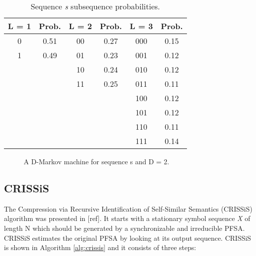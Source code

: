 {\begin{table}
\centering
\caption{Sequence \textit{s} subsequence probabilities. \label{tab:subseq}}
\begin{tabular}{|c|c|c|c|c|c|}
\hline
\textbf{L = 1} & \textbf{Prob.} & \textbf{L = 2} & \textbf{Prob.} & \textbf{L = 3} & \textbf{Prob.} \\
\hline
0 & 0.51 & 00 & 0.27 & 000 & 0.15\\
1 & 0.49 & 01 & 0.23 & 001 & 0.12\\
  &      & 10 & 0.24 & 010 & 0.12\\
  &      & 11 & 0.25 & 011 & 0.11\\
  &	     &    &      & 100 & 0.12\\
  &      &    &      & 101 & 0.12\\
  &      &    &      & 110 & 0.11\\
  &      &    &      & 111 & 0.14\\
\hline
\end{tabular}
\end{table}

\begin{figure}
\centering
{}
\caption{A D-Markov machine for sequence s and D = 2.\label{fig:dmarkov}}
\end{figure}
 
\subsection{CRISSiS}\label{sec:crissis}

The Compression via Recursive Identification of Self-Similar Semantics (CRISSiS) algorithm was presented in [ref]. It starts with a stationary symbol sequence \textit{X} of length N which should be generated by a synchronizable and irreducible PFSA. CRISSiS estimates the original PFSA by looking at its output sequence. CRISSiS is shown in Algorithm \ref{alg:crissis} and it consists of three steps:

}
